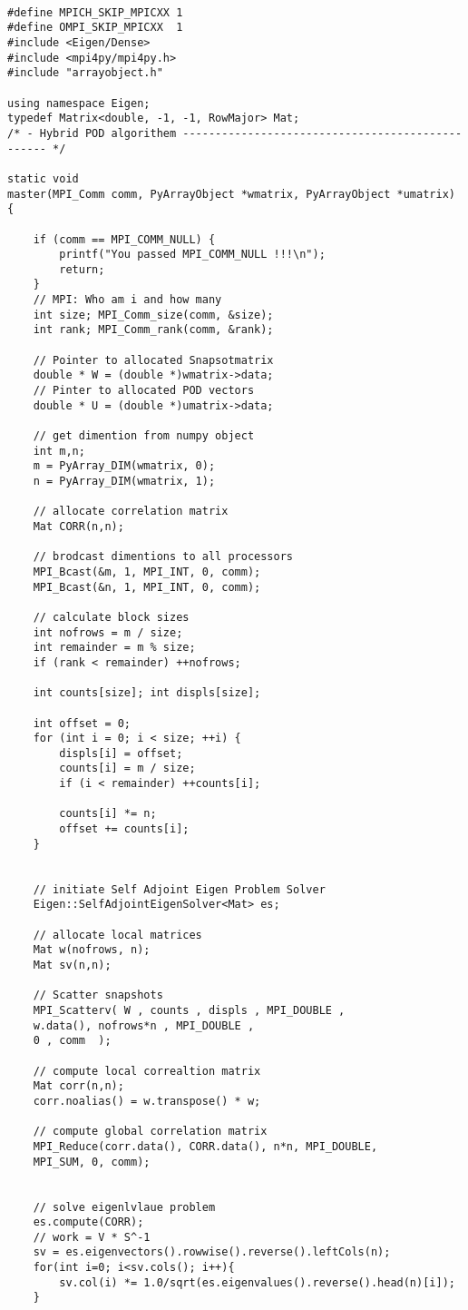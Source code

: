 \begin{lstlisting}

#define MPICH_SKIP_MPICXX 1
#define OMPI_SKIP_MPICXX  1
#include <Eigen/Dense>
#include <mpi4py/mpi4py.h>
#include "arrayobject.h"

using namespace Eigen;
typedef Matrix<double, -1, -1, RowMajor> Mat;
/* - Hybrid POD algorithem ------------------------------------------------- */

static void
master(MPI_Comm comm, PyArrayObject *wmatrix, PyArrayObject *umatrix) {
	
	if (comm == MPI_COMM_NULL) {
		printf("You passed MPI_COMM_NULL !!!\n");
		return;
	}
	// MPI: Who am i and how many
	int size; MPI_Comm_size(comm, &size);
	int rank; MPI_Comm_rank(comm, &rank);
	
	// Pointer to allocated Snapsotmatrix
	double * W = (double *)wmatrix->data;
	// Pinter to allocated POD vectors
	double * U = (double *)umatrix->data;
	
	// get dimention from numpy object
	int m,n;
	m = PyArray_DIM(wmatrix, 0);
	n = PyArray_DIM(wmatrix, 1);
	
	// allocate correlation matrix
	Mat CORR(n,n);
	
	// brodcast dimentions to all processors
	MPI_Bcast(&m, 1, MPI_INT, 0, comm);
	MPI_Bcast(&n, 1, MPI_INT, 0, comm);
	
	// calculate block sizes
	int nofrows = m / size;
	int remainder = m % size;
	if (rank < remainder) ++nofrows;
	
	int counts[size]; int displs[size];
	
	int offset = 0;
	for (int i = 0; i < size; ++i) {
		displs[i] = offset; 
		counts[i] = m / size;
		if (i < remainder) ++counts[i];
		
		counts[i] *= n; 
		offset += counts[i];
	}
	
	
	// initiate Self Adjoint Eigen Problem Solver
	Eigen::SelfAdjointEigenSolver<Mat> es;
	
	// allocate local matrices
	Mat w(nofrows, n);
	Mat sv(n,n);
	
	// Scatter snapshots
	MPI_Scatterv( W , counts , displs , MPI_DOUBLE ,
	w.data(), nofrows*n , MPI_DOUBLE ,
	0 , comm  );
	
	// compute local correaltion matrix
	Mat corr(n,n);
	corr.noalias() = w.transpose() * w; 
	
	// compute global correlation matrix
	MPI_Reduce(corr.data(), CORR.data(), n*n, MPI_DOUBLE,
	MPI_SUM, 0, comm);
	
	
	// solve eigenlvlaue problem
	es.compute(CORR);
	// work = V * S^-1
	sv = es.eigenvectors().rowwise().reverse().leftCols(n);
	for(int i=0; i<sv.cols(); i++){
		sv.col(i) *= 1.0/sqrt(es.eigenvalues().reverse().head(n)[i]);
	}
	

\end{lstlisting}
